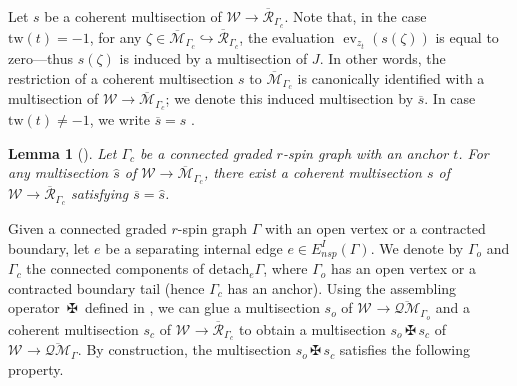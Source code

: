 \documentclass[11pt]{amsart}
\newtheorem{lem}[dummy]{Lemma}
\theoremstyle{definition}
\theoremstyle{remark}
\newcommand{\tw}{\text{tw}}
\newcommand{\Ass}{{{\,\maltese\,}}}
\newcommand{\oQMb}{{\overline{\mathcal{QM}}}}
\newcommand{\<}{\left<}
\renewcommand{\>}{\right>}
\numberwithin{equation}{section}
\def\Mbar{{\overline{\mathcal M}}}
\begin{document}
Let $s$ be a coherent multisection of $\mathcal{W} \rightarrow {\overline{\mathcal{R}}}_{\Gamma_c}$. Note that, in the case $\tw(t)=-1$, for any $\zeta\in\Mbar_{\Gamma_c} \hookrightarrow {\overline{\mathcal{R}}}_{\Gamma_c}$, the evaluation $\operatorname{ev}_{z_t}(s(\zeta))$ is equal %
to zero---thus $s(\zeta)$ %
is induced by a multisection of $J$.  In other words, the restriction of a coherent multisection $s$ to $\Mbar_{\Gamma_c}$ is canonically identified with a multisection of ${\mathcal{W}} \rightarrow \Mbar_{\Gamma_c}$; we denote this induced multisection by $\overline{s}$.  In case $\tw(t)\ne -1$, we write $\overline{s} = s$%
.
\begin{lem}[{\cite[Lemma 2.12]{TZ2}}]
    Let $\Gamma_c$ be a connected graded $r$-spin graph with %
an anchor %
$t$. For any %
multisection $\hat s$ of $\mathcal W\to \Mbar_{\Gamma_c}$,
    there exist a coherent multisection $s$ of $\mathcal W\to {\overline{\mathcal{R}}}_{\Gamma_c}$ satisfying $\overline{s}=\hat s$.
\end{lem}






Given a connected graded $r$-spin graph $\Gamma$ with an open vertex or a contracted boundary, let $e$ be a separating internal edge $e\in E_{nsp}^I(\Gamma)$. We denote by $\Gamma_o$ and $\Gamma_c$ the connected components of ${\text{detach} }_e \Gamma$, where $\Gamma_o$ has an open vertex or a contracted boundary tail (hence $\Gamma_c$ has an anchor). Using the assembling operator $\Ass$ defined in \cite[\S 4.1.3]{BCT2}, we can glue a multisection $s_o$ of $\mathcal W^{}\to \oQMb_{\Gamma_o}$ and a coherent multisection $s_c$ of $\mathcal W^{}\to {\overline{\mathcal{R}}}_{\Gamma_c}$ to obtain a multisection $s_o\Ass s_c$ of $\mathcal W^{}\to \oQMb_{\Gamma}$. %
By construction, the %
multisection $s_o\Ass s_c$ satisfies the following property.
\end{document}
